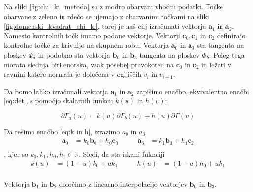\documentclass[a4paper,regno]{article}
\newcommand{\tbf}{\textbf}
\begin{document}
	Na sliki \ref{fig:chi_ki_metoda} so z modro obarvani vhodni podatki.
	Točke obarvane z zeleno in rdečo se ujemajo z obarvanimi točkami na sliki 
	\ref{fig:domenski_kvadrat_chi_ki}, torej je naš cilj izračunati vektorja $\textbf{a}_1$ in 
	$\textbf{a}_2$.  Namesto kontrolnih točk imamo podane vektorje. Vektorji $\textbf{c}_0, \textbf{c}_1$ in $\textbf{c}_2$
	definirajo kontrolne točke za krivuljo na skupnem robu. Vektorja $\textbf{a}_0$ in $\textbf{a}_3$ 
	sta tangenta na ploskev $\Phi_a$ in podobno sta vektorja $\textbf{b}_0$ in $\textbf{b}_3$ tangenta 
	na ploskev $\Phi_b$. Poleg tega morata slednja biti enotska,
	vsak posebej pravokoten na $\textbf{c}_0$ in $\textbf{c}_2$ in ležati v ravnini katere normala je določena
	v ogljiščih $v_i$ in $v_{i + 1}$.

	Da bomo lahko izračunali vektorja $\textbf{a}_1$ in $\textbf{a}_2$ zapišimo enačbo, ekvivalentno
	enačbi \ref{eq:det}, s pomočjo skalarnih funkcij $k(u)$ in $h(u)$:

	\begin{equation}
		\label{eq:k in h}
		\partial \Gamma_a(u) = k(u) \partial \Gamma_b(u) + h(u) \partial \Gamma(u)
	\end{equation}
	
	Da rešimo enačbo \ref{eq:k in h}, izrazimo $a_0$ in $a_3$
	\begin{equation*}
		\begin{split}
			\tbf{a}_0 &= k_0\tbf{b}_0 + h_0\tbf{c}_0 \\
		\end{split}
		\quad\quad
		\begin{split}
			\tbf{a}_3 &= k_1\tbf{b}_3 + h_1\tbf{c}_2 \\
		\end{split}
	\end{equation*},
	kjer so $k_0, k_1, h_0, h_1 \in \mathbb{R}$. Sledi, da sta iskani fuknciji
	\begin{equation*}
		\begin{split}
			k(u) &= (1 - u) k_0 + u k_1 \\
		\end{split}
		\quad\quad
		\begin{split}
			h(u) &= (1 - u) h_0 + u h_1 \\
		\end{split}
	\end{equation*}

	Vektorja $\textbf{b}_1$ in $\textbf{b}_2$ določimo z linearno interpolacijo 
	vektorjev $\textbf{b}_0$ in $\textbf{b}_3$.
\end{document}
